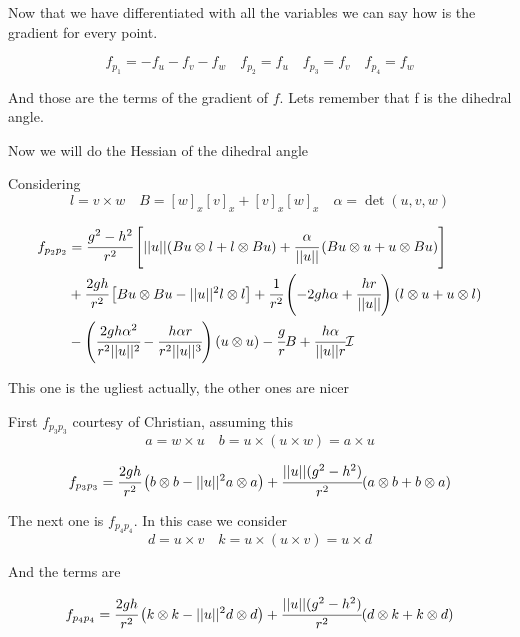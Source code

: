 \documentclass[11pt]{article}
\theoremstyle{plain}
\theoremstyle{definition}
\begin{document}
Now that we have differentiated with all the variables we can say how is the gradient for every point.


\begin{equation}
    f_{p_1} = -f_u-f_v-f_w \quad f_{p_2} = f_u \quad f_{p_3} = f_v \quad f_{p_4} = f_w
\end{equation}

And those are the terms of the gradient of $f$. Lets remember that f is the dihedral angle.

Now we will do the Hessian of the dihedral angle 


Considering  
\begin{equation}
 l = v\times w \quad B = [w]_x[v]_x + [v]_x[w]_x  \quad \alpha = \det(u,v,w)
\end{equation}

\begin{align}
    f_{p_2p_2}  &= \cfrac{g^2-h^2}{r^2} \left[ ||u|| (Bu \otimes l + l \otimes Bu ) + \cfrac{\alpha}{||u||}\left( Bu \otimes u + u \otimes Bu \right)    \right]\\
    &+\cfrac{2gh}{r^2}\left[ Bu\otimes Bu - ||u||^2 l \otimes l  \right] + \cfrac{1}{r^2}\left(-2gh\alpha + \cfrac{hr}{||u||}\right)\left(l\otimes u + u \otimes l \right)\\
    & - \left(\cfrac{2gh\alpha^2}{r^2 ||u||^2} - \cfrac{h\alpha r }{r^2 ||u||^3} \right)(u \otimes u) - \cfrac{g}{r}B + \cfrac{h\alpha }{||u|| r} \mathcal{I}
\end{align}


This one is the ugliest actually, the other ones are nicer 

First $f_{p_3p_3}$ courtesy of Christian, assuming this 
\begin{equation}
    a = w\times u \quad b = u \times (u\times w) = a\times u 
\end{equation}

\begin{align}
    f_{p_3p_3} = \cfrac{2gh }{r^2}\left(b\otimes b - ||u||^2 a\otimes a \right) + \cfrac{||u||(g^2-h^2)}{r^2} (a\otimes b + b\otimes a)
\end{align}


The next one is $f_{p_4p_4}$.
In this case we consider 
\begin{equation}
    d = u\times v \quad k = u \times (u\times v) = u\times d
\end{equation}

And the terms are 

\begin{align}
    f_{p_4p_4} = \cfrac{2gh}{r^2}\left(k\otimes k - ||u||^2 d\otimes d \right) + \cfrac{||u||(g^2-h^2)}{r^2} (d\otimes k + k\otimes d)
\end{align}
\end{document}
